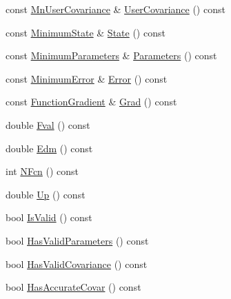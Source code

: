 \begin{DoxyCompactItemize}
\item 
const \mbox{\hyperlink{classROOT_1_1Minuit2_1_1MnUserCovariance}{Mn\+User\+Covariance}} \& \mbox{\hyperlink{classROOT_1_1Minuit2_1_1FunctionMinimum_aeb3d5cb9f9c49838fa4b08668c8556db}{User\+Covariance}} () const
\item 
const \mbox{\hyperlink{classROOT_1_1Minuit2_1_1MinimumState}{Minimum\+State}} \& \mbox{\hyperlink{classROOT_1_1Minuit2_1_1FunctionMinimum_aa57279a22070860400c8854289c84314}{State}} () const
\item 
const \mbox{\hyperlink{classROOT_1_1Minuit2_1_1MinimumParameters}{Minimum\+Parameters}} \& \mbox{\hyperlink{classROOT_1_1Minuit2_1_1FunctionMinimum_a069ba097db08f87582b309330ef8aa6e}{Parameters}} () const
\item 
const \mbox{\hyperlink{classROOT_1_1Minuit2_1_1MinimumError}{Minimum\+Error}} \& \mbox{\hyperlink{classROOT_1_1Minuit2_1_1FunctionMinimum_a24f73efe7b4ed139bcf28e62ab01b347}{Error}} () const
\item 
const \mbox{\hyperlink{classROOT_1_1Minuit2_1_1FunctionGradient}{Function\+Gradient}} \& \mbox{\hyperlink{classROOT_1_1Minuit2_1_1FunctionMinimum_ac97896abe1c4625c519c2b07e4e9b670}{Grad}} () const
\item 
double \mbox{\hyperlink{classROOT_1_1Minuit2_1_1FunctionMinimum_a72aa9fd2b33f1bb56c5b053d536cc32c}{Fval}} () const
\item 
double \mbox{\hyperlink{classROOT_1_1Minuit2_1_1FunctionMinimum_aef90d7ca242a7ea211d56b188679f4b9}{Edm}} () const
\item 
int \mbox{\hyperlink{classROOT_1_1Minuit2_1_1FunctionMinimum_a8af0f1813c9ae51d7a57a1de0cbae42f}{N\+Fcn}} () const
\item 
double \mbox{\hyperlink{classROOT_1_1Minuit2_1_1FunctionMinimum_a53be50e5f3a36b22144bb98fc55c9340}{Up}} () const
\item 
bool \mbox{\hyperlink{classROOT_1_1Minuit2_1_1FunctionMinimum_a6525270e63f1cf16206387257b247b69}{Is\+Valid}} () const
\item 
bool \mbox{\hyperlink{classROOT_1_1Minuit2_1_1FunctionMinimum_a723b0ab6157e57113a142f1d4a31ace2}{Has\+Valid\+Parameters}} () const
\item 
bool \mbox{\hyperlink{classROOT_1_1Minuit2_1_1FunctionMinimum_ac2510d8f560ddac6b2911bda454e2948}{Has\+Valid\+Covariance}} () const
\item 
bool \mbox{\hyperlink{classROOT_1_1Minuit2_1_1FunctionMinimum_a5135f697042ef9ad81c68185c8610019}{Has\+Accurate\+Covar}} () const
\item 

\end{DoxyCompactItemize}
